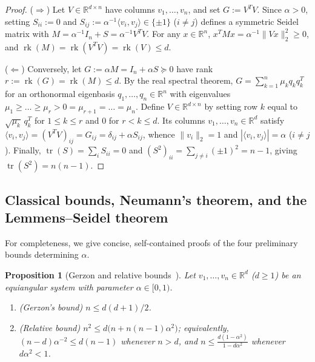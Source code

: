 \documentclass[11pt,reqno]{amsart}
\newtheorem{proposition}[theorem]{Proposition}
\theoremstyle{definition}
\theoremstyle{remark}
\numberwithin{equation}{section}
\numberwithin{table}{section}
\DeclareMathOperator{\tr}{tr}
\DeclareMathOperator{\rk}{rk}
\begin{document}
\begin{proof}
($\Rightarrow$) Let $V \in \mathbb{R}^{d \times n}$ have columns $v_1, \dots, v_n$, and set $G := V^T V$. Since $\alpha > 0$, setting $S_{ii} := 0$ and $S_{ij} := \alpha^{-1}\langle v_i, v_j \rangle \in \{\pm 1\}$ ($i \neq j$) defines a symmetric Seidel matrix with $M = \alpha^{-1}I_n + S = \alpha^{-1} V^T V$. For any $x \in \mathbb{R}^n$, $x^T M x = \alpha^{-1}\|Vx\|_2^2 \ge 0$, and $\rk(M) = \rk(V^T V) = \rk(V) \le d$.

($\Leftarrow$) Conversely, let $G := \alpha M = I_n + \alpha S \succeq 0$ have rank $r := \rk(G) = \rk(M) \le d$. By the real spectral theorem, $G = \sum_{k=1}^n \mu_k q_k q_k^T$ for an orthonormal eigenbasis $q_1, \dots, q_n \in \mathbb{R}^n$ with eigenvalues $\mu_1 \ge \dots \ge \mu_r > 0 = \mu_{r+1} = \dots = \mu_n$. Define $V \in \mathbb{R}^{d \times n}$ by setting row $k$ equal to $\sqrt{\mu_k}\,q_k^T$ for $1 \le k \le r$ and $0$ for $r < k \le d$. Its columns $v_1, \dots, v_n \in \mathbb{R}^d$ satisfy $\langle v_i, v_j \rangle = (V^T V)_{ij} = G_{ij} = \delta_{ij} + \alpha S_{ij}$, whence $\|v_i\|_2 = 1$ and $|\langle v_i, v_j \rangle| = \alpha$ ($i \neq j$). Finally, $\tr(S) = \sum_i S_{ii} = 0$ and $(S^2)_{ii} = \sum_{j \neq i} (\pm 1)^2 = n - 1$, giving $\tr(S^2) = n(n - 1)$.
\end{proof}

\subsection{Classical bounds, Neumann's theorem, and the Lemmens--Seidel theorem}
For completeness, we give concise, self-contained proofs of the four preliminary bounds determining $\alpha$.

\begin{proposition}[Gerzon and relative bounds~\cite{vanLintSeidel1966,LemmensSeidel1973}]\label{prop:gerzon_rel}
Let $v_1, \dots, v_n \in \mathbb{R}^d$ ($d \ge 1$) be an equiangular system with parameter $\alpha \in [0, 1)$.
\begin{enumerate}
  \item \emph{(Gerzon's bound)} $n \le d(d + 1)/2$.
  \item \emph{(Relative bound)} $n^2 \le d\big(n + n(n - 1)\alpha^2\big)$; equivalently, $(n - d)\alpha^{-2} \le d(n - 1)$ whenever $n > d$, and $n \le \frac{d(1 - \alpha^2)}{1 - d\alpha^2}$ whenever $d\alpha^2 < 1$.
\end{enumerate}
\end{proposition}
\end{document}
